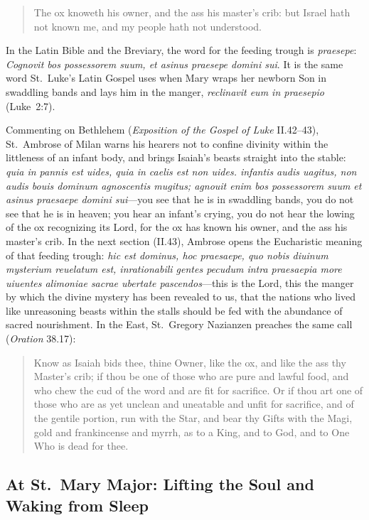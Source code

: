 \begin{quote}
The ox knoweth his owner, and the ass his master's crib: but Israel
hath not known me, and my people hath not understood.
\end{quote}

In the Latin Bible and the Breviary, the word for the feeding trough is
\textit{praesepe}: \textit{Cognovit bos possessorem suum, et asinus
praesepe domini sui}. It is the same word St.~Luke's Latin Gospel uses
when Mary wraps her newborn Son in swaddling bands and lays him in the
manger, \textit{reclinavit eum in praesepio} (Luke~2:7).

Commenting on Bethlehem (\textit{Exposition of the Gospel of Luke}
II.42--43), St.~Ambrose of Milan warns his hearers not to confine
divinity within the littleness of an infant body, and brings Isaiah's
beasts straight into the stable: \textit{quia in pannis est uides, quia
in caelis est non uides. infantis audis uagitus, non audis bouis dominum
agnoscentis mugitus; agnouit enim bos possessorem suum et asinus
praesaepe domini sui}---you see that he is in swaddling bands, you do
not see that he is in heaven; you hear an infant's crying, you do not
hear the lowing of the ox recognizing its Lord, for the ox has known his
owner, and the ass his master's crib. In the next section (II.43),
Ambrose opens the Eucharistic meaning of that feeding trough:
\textit{hic est dominus, hoc praesaepe, quo nobis diuinum mysterium
reuelatum est, inrationabili gentes pecudum intra praesaepia more
uiuentes alimoniae sacrae ubertate pascendos}---this is the Lord, this
the manger by which the divine mystery has been revealed to us, that the
nations who lived like unreasoning beasts within the stalls should be
fed with the abundance of sacred nourishment. In the East, St.~Gregory
Nazianzen preaches the same call (\textit{Oration} 38.17):

\begin{quote}
Know as Isaiah bids thee, thine Owner, like the ox, and like the ass
thy Master's crib; if thou be one of those who are pure and lawful food,
and who chew the cud of the word and are fit for sacrifice. Or if thou
art one of those who are as yet unclean and uneatable and unfit for
sacrifice, and of the gentile portion, run with the Star, and bear thy
Gifts with the Magi, gold and frankincense and myrrh, as to a King, and
to God, and to One Who is dead for thee.
\end{quote}

\subsection{At St.~Mary Major: Lifting the Soul and Waking from Sleep}

